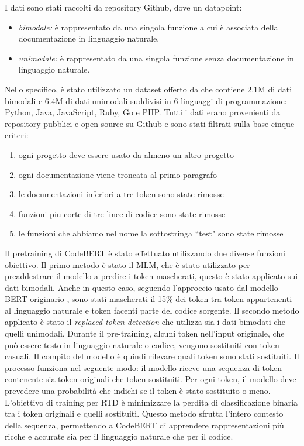 \documentclass[../../Thesis.tex]{subfiles}
\begin{document}
I dati sono stati raccolti da repository Github, dove un datapoint:
\begin{itemize}
    \item \emph{bimodale:} \`e rappresentato da una singola funzione a cui \`e associata della documentazione in linguaggio naturale.
    \item \emph{unimodale:} \`e rappresentato da una singola funzione senza documentazione in 
    linguaggio naturale.
\end{itemize}
Nello specifico, \`e stato utilizzato un dataset offerto da \cite{CodeBERTDataset} che contiene 2.1M di dati bimodali e 6.4M di dati unimodali suddivisi in 6 linguaggi di programmazione: Python, Java, JavaScript, Ruby, Go e PHP. Tutti i dati erano provenienti da repository pubblici e open-source su Github e sono stati filtrati sulla base cinque criteri:
\begin{enumerate}
    \item ogni progetto deve essere usato da almeno un altro progetto 
    \item ogni documentazione viene troncata al primo paragrafo
    \item le documentazioni inferiori a tre token sono state rimosse
    \item funzioni piu corte di tre linee di codice sono state rimosse
    \item le funzioni che abbiamo nel nome la sottostringa ``test" sono state rimosse
\end{enumerate}
Il pretraining di CodeBERT \`e stato effettuato utilizzando due diverse funzioni obiettivo. Il primo metodo \`e stato il MLM, che \`e stato utilizzato per preaddestrare il modello a predire i token mascherati, questo \`e stato applicato sui dati bimodali. Anche in questo caso, seguendo l'approccio usato dal modello BERT originario \cite{BERT},  sono stati mascherati il 15\% dei token tra token appartenenti al linguaggio naturale e token facenti parte del codice sorgente. Il secondo metodo applicato \`e stato il \emph{replaced token detection} che utilizza sia i dati bimodati che quelli unimodali.  Durante il pre-training, alcuni token nell'input originale, che pu\`o essere testo in linguaggio naturale o codice, vengono sostituiti con token casuali. Il compito del modello \`e quindi rilevare quali token sono stati sostituiti. Il processo funziona nel seguente modo: il modello riceve una sequenza di token contenente sia token originali che token sostituiti. Per ogni token, il modello deve prevedere una probabilit\`a che indichi se il token \`e stato sostituito o meno. L'obiettivo di training per RTD \`e minimizzare la perdita di classificazione binaria tra i token originali e quelli sostituiti. Questo metodo sfrutta l'intero contesto della sequenza, permettendo a CodeBERT di apprendere rappresentazioni pi\`u ricche e accurate sia per il linguaggio naturale che per il codice.
\end{document}
